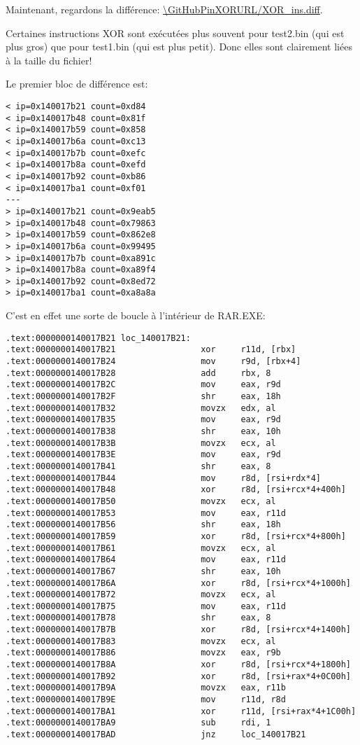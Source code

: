Maintenant, regardons la différence: \url{\GitHubPinXORURL/XOR_ins.diff}.

Certaines instructions XOR sont exécutées plus souvent pour test2.bin (qui est plus
gros) que pour test1.bin (qui est plus petit).
Donc elles sont clairement liées à la taille du fichier!

Le premier bloc de différence est:

\begin{lstlisting}
< ip=0x140017b21 count=0xd84
< ip=0x140017b48 count=0x81f
< ip=0x140017b59 count=0x858
< ip=0x140017b6a count=0xc13
< ip=0x140017b7b count=0xefc
< ip=0x140017b8a count=0xefd
< ip=0x140017b92 count=0xb86
< ip=0x140017ba1 count=0xf01
---
> ip=0x140017b21 count=0x9eab5
> ip=0x140017b48 count=0x79863
> ip=0x140017b59 count=0x862e8
> ip=0x140017b6a count=0x99495
> ip=0x140017b7b count=0xa891c
> ip=0x140017b8a count=0xa89f4
> ip=0x140017b92 count=0x8ed72
> ip=0x140017ba1 count=0xa8a8a
\end{lstlisting}

C'est en effet une sorte de boucle à l'intérieur de RAR.EXE:

\begin{lstlisting}
.text:0000000140017B21 loc_140017B21:
.text:0000000140017B21                 xor     r11d, [rbx]
.text:0000000140017B24                 mov     r9d, [rbx+4]
.text:0000000140017B28                 add     rbx, 8
.text:0000000140017B2C                 mov     eax, r9d
.text:0000000140017B2F                 shr     eax, 18h
.text:0000000140017B32                 movzx   edx, al
.text:0000000140017B35                 mov     eax, r9d
.text:0000000140017B38                 shr     eax, 10h
.text:0000000140017B3B                 movzx   ecx, al
.text:0000000140017B3E                 mov     eax, r9d
.text:0000000140017B41                 shr     eax, 8
.text:0000000140017B44                 mov     r8d, [rsi+rdx*4]
.text:0000000140017B48                 xor     r8d, [rsi+rcx*4+400h]
.text:0000000140017B50                 movzx   ecx, al
.text:0000000140017B53                 mov     eax, r11d
.text:0000000140017B56                 shr     eax, 18h
.text:0000000140017B59                 xor     r8d, [rsi+rcx*4+800h]
.text:0000000140017B61                 movzx   ecx, al
.text:0000000140017B64                 mov     eax, r11d
.text:0000000140017B67                 shr     eax, 10h
.text:0000000140017B6A                 xor     r8d, [rsi+rcx*4+1000h]
.text:0000000140017B72                 movzx   ecx, al
.text:0000000140017B75                 mov     eax, r11d
.text:0000000140017B78                 shr     eax, 8
.text:0000000140017B7B                 xor     r8d, [rsi+rcx*4+1400h]
.text:0000000140017B83                 movzx   ecx, al
.text:0000000140017B86                 movzx   eax, r9b
.text:0000000140017B8A                 xor     r8d, [rsi+rcx*4+1800h]
.text:0000000140017B92                 xor     r8d, [rsi+rax*4+0C00h]
.text:0000000140017B9A                 movzx   eax, r11b
.text:0000000140017B9E                 mov     r11d, r8d
.text:0000000140017BA1                 xor     r11d, [rsi+rax*4+1C00h]
.text:0000000140017BA9                 sub     rdi, 1
.text:0000000140017BAD                 jnz     loc_140017B21
\end{lstlisting}

